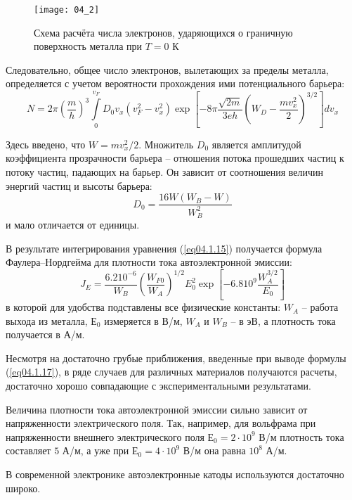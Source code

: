 \begin{figure}[h]
    \center
    \texttt{[image: 04\_2]}
    \caption{Схема расчёта числа электронов, ударяющихся о граничную 
    	поверхность металла при \( T = 0 \) К}
    \label{img04.2}
\end{figure}
Следовательно, общее число электронов, вылетающих за пределы металла, 
определяется с учетом вероятности прохождения ими потенциального барьера:
\begin{equation}
	N = 2\pi\left( \frac{m}{h} \right)^3 \int\limits_{0}^{v_F} 
		D_0 v_x \left( v^2_F - v^2_x \right) 
		\exp\left[ -8\pi\frac{\sqrt{2m}}{3eh} 
		\left( W_D - \frac{mv^2_x}{2} \right)^{3/2} \right] dv_x
	\label{eq04.1.15}
\end{equation}

Здесь введено, что \( W = mv^2_x / 2 \). Множитель \( D_0 \) является 
амплитудой коэффициента прозрачности барьера -- отношения потока прошедших 
частиц к потоку частиц, падающих на барьер. Он зависит от соотношения величин 
энергий частиц и высоты барьера:
\begin{equation}
	D_0 = \frac{16W(W_B-W)}{W^2_B}
	\label{eq04.1.16}
\end{equation}
и мало отличается от единицы.

В результате интегрирования уравнения (\ref{eq04.1.15}) получается формула 
Фаулера–Нордгейма для плотности тока автоэлектронной эмиссии:
\begin{equation}
	J_E = \frac{6.210^{-6}}{W_B}\left( \frac{W_{F0}}{W_A} \right)^{1/2}
		E^2_0 \exp\left[ -6.810^9 \frac{W_A^{3/2}}{E_0} \right]
	\label{eq04.1.17}
\end{equation}
в которой для удобства подставлены все физические константы: \( W_A \) -- 
работа выхода из металла, \( Е_0 \) измеряется в В/м, \( W_A \) и \( W_B \) -- 
в эВ, а плотность тока получается в А/м.

Несмотря на достаточно грубые приближения, введенные при выводе формулы 
(\ref{eq04.1.17}), в ряде случаев для различных материалов получаются расчеты, 
достаточно хорошо совпадающие с экспериментальными результатами.

Величина плотности тока автоэлектронной эмиссии сильно зависит от 
напряженности электрического поля. Так, например, для вольфрама при 
напряженности внешнего электрического поля \( Е_0 = 2\cdot10^9 \) В/м 
плотность тока составляет \( 5 \) А/м, а уже при \( Е_0 = 4\cdot10^9 \) В/м 
она равна \( 10^8 \) А/м.

В современной электронике автоэлектронные катоды используются достаточно 
широко.
